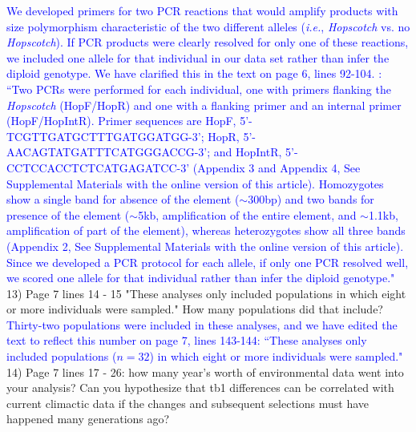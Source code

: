 \documentclass[11pt]{article}
\newcommand{\res}[1]{\noindent \textcolor{blue}{{#1}} \\}
\begin{document}
\res{We developed primers for two PCR reactions that would amplify products with size polymorphism characteristic of the two different alleles (\emph{i.e.}, \emph{Hopscotch} vs. no \emph{Hopscotch}). If PCR products were clearly resolved for only one of these reactions, we included one allele for that individual in our data set rather than infer the diploid genotype. We have clarified this in the text on page 6, lines 92-104. : ``Two PCRs were performed for each individual, one with primers flanking the \emph{Hopscotch} (HopF/HopR) and one with a flanking primer and an internal primer (HopF/HopIntR). Primer sequences are HopF, {\small 5'-TCGTTGATGCTTTGATGGATGG-3'}; 
HopR, {\small 5'-AACAGTATGATTTCATGGGACCG-3'}; and HopIntR, {\small  5'-CCTCCACCTCTCATGAGATCC-3'} (Appendix 3 and Appendix 4, See Supplemental Materials with the online version of this article). Homozygotes show a single band for absence of the element ($\sim$300bp) and two bands for presence of the element ($\sim$5kb, amplification of the entire element, and $\sim$1.1kb, amplification of part of the element), whereas heterozygotes show all three bands (Appendix 2, See Supplemental Materials with the online version of this article). Since we developed a PCR protocol for each allele, if only one PCR resolved well, we scored one allele for that individual rather than infer the diploid genotype."}

13) Page 7 lines 14 - 15 "These analyses only included populations in which eight or more individuals were sampled."  How many populations did that include?\\
 
\res{Thirty-two populations were included in these analyses, and we have edited the text to reflect this number on page 7, lines 143-144: ``These analyses only included populations ($n = 32$) in which eight or more individuals were sampled."}

14) Page 7 lines 17 - 26: how many year's worth of environmental data went into your analysis? Can you hypothesize that tb1 differences can be correlated with current climactic data if the changes and subsequent selections must have happened many generations ago?\\
 
\end{document}
